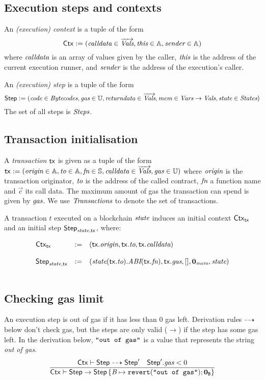\documentclass[12pt]{extarticle}
\begin{document}
\subsection{Execution steps and contexts}

An \emph{(execution) context} is a tuple of the form 
$$
\mathsf{Ctx}:=(\textit{calldata}\in\overrightarrow{\textit{Vals}},\textit{this}\in\mathbb{A},\textit{sender}\in\mathbb{A})
$$
where $\textit{calldata}$ is an array of values given by the caller, $\textit{this}$ is the address of the current execution runner, 
and $\textit{sender}$ is the address of the execution's caller. 

An \emph{(execution) step} is a tuple of the form
$$
\mathsf{Step}:=(
    \textit{code}\in\textit{Bytecodes},
    \textit{gas}\in\mathbb{U},
    \textit{returndata}\in\overrightarrow{\textit{Vals}}, 
    \textit{mem}\in\textit{Vars}\to\textit{Vals}, 
    \textit{state}\in\textit{States}
)
$$
The set of all steps is $\textit{Steps}$. 

\subsection{Transaction initialisation}
A \emph{transaction} $\mathsf{tx}$ is given as a tuple of the form $\mathsf{tx}:=(\textit{origin}\in\mathbb{A},\textit{to}\in\mathbb{A},\textit{fn}\in\mathbb{S},\textit{calldata}\in\overrightarrow{\textit{Vals}}, \textit{gas}\in\mathbb{U})$ where $\textit{origin}$ is the transaction originator, $\textit{to}$ is the address of the called contract, $\textit{fn}$ a function name and $\vec c$ its call data. The maximum amount of gas the transaction can spend is given by $\textit{gas}$.
We use $\textit{Transactions}$ to denote the set of transactions.

A transaction $t$ executed on a blockchain $\textit{state}$ induces an initial context $\mathsf{Ctx}_{\mathsf{tx}}$ and an initial step $\mathsf{Step}_{\textit{state},\mathsf{tx}}$, where:

$$ \begin{array} {lll}
\mathsf{Ctx}_{\mathsf{tx}} &:=& (\mathsf{tx}.\textit{origin},\mathsf{tx}.\textit{to},\mathsf{tx}.\textit{calldata})\\\\
\mathsf{Step}_{\textit{state},\mathsf{tx}} &:=& (\textit{state}(\mathsf{tx}.\textit{to}).\textit{ABI}(\mathsf{tx}.\textit{fn}),\mathsf{tx}.\textit{gas}, [],\mathbf{0}_{\textit{mem}},\textit{state})\\\\
\end{array}$$

\subsection{Checking gas limit}
An execution step is out of gas if it has less than $0$ gas left. Derivation rules $\dashrightarrow$ below don't check gas, but the steps are only valid ($\rightarrow$) if the step has some gas left. In the derivation below, $\hbox{\rm\texttt{"out of gas"}}$ is a value that represents the string \emph{out of gas}.
\begin{equation}
\dfrac{
\mathsf{Ctx}\vdash\mathsf{Step}\dashrightarrow \mathsf{Step}' \quad \mathsf{Step}'.\textit{gas} < 0
}{
\mathsf{Ctx}\vdash\mathsf{Step}\to \mathsf{Step}\left\{\textit{B}\mapsto \mathtt{revert}(\hbox{\rm\texttt{"out of gas"}});\mathbf{0}_{\texttt{B}}\right\}
}
\end{equation}
\end{document}
